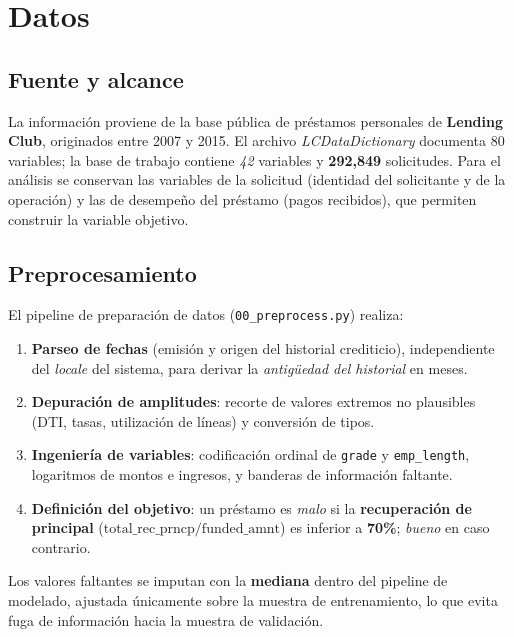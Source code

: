 \documentclass[11pt,letterpaper]{article}
\begin{document}
\section{Datos}

\subsection{Fuente y alcance}

La información proviene de la base pública de préstamos personales de
\textbf{Lending Club}, originados entre 2007 y 2015. El archivo
\emph{LCDataDictionary} documenta 80 variables; la base de trabajo contiene
\emph{42} variables y \textbf{292{,}849} solicitudes. Para el análisis se
conservan las variables de la solicitud (identidad del solicitante y de la
operación) y las de desempeño del préstamo (pagos recibidos), que permiten
construir la variable objetivo.

\subsection{Preprocesamiento}

El pipeline de preparación de datos (\texttt{00\_preprocess.py}) realiza:

\begin{enumerate}
  \item \textbf{Parseo de fechas} (emisión y origen del historial crediticio),
        independiente del \emph{locale} del sistema, para derivar la
        \emph{antigüedad del historial} en meses.
  \item \textbf{Depuración de amplitudes}: recorte de valores extremos no
        plausibles (DTI, tasas, utilización de líneas) y conversión de tipos.
  \item \textbf{Ingeniería de variables}: codificación ordinal de
        \texttt{grade} y \texttt{emp\_length}, logaritmos de montos e
        ingresos, y banderas de información faltante.
  \item \textbf{Definición del objetivo}: un préstamo es \emph{malo} si la
        \textbf{recuperación de principal} ($\text{total\_rec\_prncp} /
        \text{funded\_amnt}$) es inferior a \textbf{70\%};
        \emph{bueno} en caso contrario.
\end{enumerate}

Los valores faltantes se imputan con la \textbf{mediana} dentro del pipeline de
modelado, ajustada únicamente sobre la muestra de entrenamiento, lo que evita
fuga de información hacia la muestra de validación.
\end{document}
